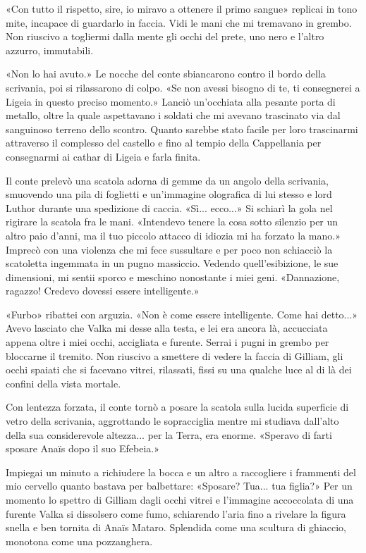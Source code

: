 «Con tutto il rispetto, sire, io miravo a ottenere il primo sangue»
replicai in tono mite, incapace di guardarlo in faccia. Vidi le mani che
mi tremavano in grembo. Non riuscivo a togliermi dalla mente gli occhi
del prete, uno nero e l'altro azzurro, immutabili.

«Non lo hai avuto.» Le nocche del conte sbiancarono contro il bordo
della scrivania, poi si rilassarono di colpo. «Se non avessi bisogno di
te, ti consegnerei a Ligeia in questo preciso momento.» Lanciò
un'occhiata alla pesante porta di metallo, oltre la quale aspettavano i
soldati che mi avevano trascinato via dal sanguinoso terreno dello
scontro. Quanto sarebbe stato facile per loro trascinarmi attraverso il
complesso del castello e fino al tempio della Cappellania per
consegnarmi ai cathar di Ligeia e farla finita.

Il conte prelevò una scatola adorna di gemme da un angolo della
scrivania, smuovendo una pila di foglietti e un'immagine olografica di
lui stesso e lord Luthor durante una spedizione di caccia. «Sì...
ecco...» Si schiarì la gola nel rigirare la scatola fra le mani.
«Intendevo tenere la cosa sotto silenzio per un altro paio d'anni, ma il
tuo piccolo attacco di idiozia mi ha forzato la mano.» Imprecò con una
violenza che mi fece sussultare e per poco non schiacciò la scatoletta
ingemmata in un pugno massiccio. Vedendo {quell'esibizione}, le sue
dimensioni, mi sentii sporco e meschino nonostante i miei geni.
«Dannazione, ragazzo! Credevo dovessi essere intelligente.»

«Furbo» ribattei con arguzia. «Non è come essere intelligente. Come hai
detto...» Avevo lasciato che Valka mi desse alla testa, e lei era ancora
là, accucciata appena oltre i miei occhi, accigliata e furente. Serrai i
pugni in grembo per bloccarne il tremito. Non riuscivo a smettere di
vedere la faccia di Gilliam, gli occhi spaiati che si facevano vitrei,
rilassati, fissi su una qualche luce al di là dei confini della vista
mortale.

Con lentezza forzata, il conte tornò a posare la scatola sulla lucida
superficie di vetro della scrivania, aggrottando le sopracciglia mentre
mi studiava dall'alto della sua considerevole altezza... per la Terra,
era enorme. «Speravo di farti sposare Anaïs dopo il suo Efebeia.»

Impiegai un minuto a richiudere la bocca e un altro a raccogliere i
frammenti del mio cervello quanto bastava per balbettare: «Sposare?
Tua... tua figlia?» Per un momento lo spettro di Gilliam dagli occhi
vitrei e l'immagine accoccolata di una furente Valka si dissolsero come
fumo, schiarendo l'aria fino a rivelare la figura snella e ben tornita
di Anaïs Mataro. Splendida come una scultura di ghiaccio, monotona come
una pozzanghera.

